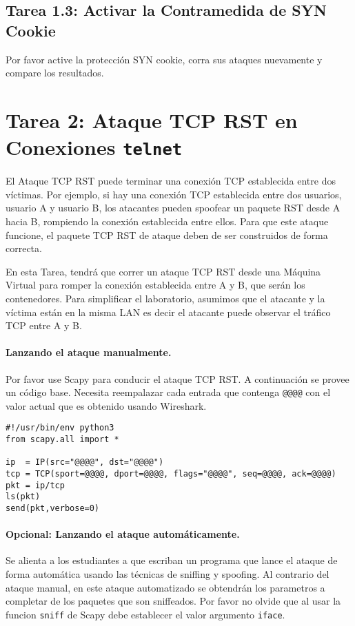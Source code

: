 \subsection{Tarea 1.3: Activar la Contramedida de SYN Cookie}

Por favor active la protección SYN cookie, corra sus ataques nuevamente y compare los resultados. 


\section {Tarea 2: Ataque TCP RST en Conexiones \texttt{telnet}}

El Ataque TCP RST puede terminar una conexión TCP establecida entre dos víctimas. Por ejemplo, si hay una conexión TCP \telnet establecida entre dos usuarios, usuario A y usuario B, los atacantes pueden spoofear un paquete RST desde A hacia B, rompiendo la conexión establecida entre ellos. Para que este ataque funcione, el paquete TCP RST de ataque deben de ser construidos de forma correcta.

En esta Tarea, tendrá que correr un ataque TCP RST desde una Máquina Virtual para romper la conexión \telnet establecida entre A y B, que serán los contenedores. Para simplificar el laboratorio, asumimos que el atacante y la víctima están en la misma LAN es decir el atacante puede observar el tráfico TCP entre A y B.


\paragraph{Lanzando el ataque manualmente.} 
Por favor use Scapy para conducir el ataque TCP RST.
A continuación se provee un código base. Necesita reempalazar cada entrada que contenga \texttt{@@@@} con el valor actual que es obtenido usando Wireshark.

\begin{lstlisting}
#!/usr/bin/env python3
from scapy.all import *

ip  = IP(src="@@@@", dst="@@@@")
tcp = TCP(sport=@@@@, dport=@@@@, flags="@@@@", seq=@@@@, ack=@@@@)
pkt = ip/tcp
ls(pkt)
send(pkt,verbose=0)
\end{lstlisting}

\paragraph{Opcional: Lanzando el ataque automáticamente.} 
Se alienta a los estudiantes a que escriban un programa que lance el ataque de forma automática usando las técnicas de sniffing y spoofing. Al contrario del ataque manual, en este ataque automatizado se obtendrán los parametros a completar de los paquetes que son sniffeados.
Por favor no olvide que al usar la funcion \texttt{sniff} de Scapy debe establecer el valor argumento \texttt{iface}.

